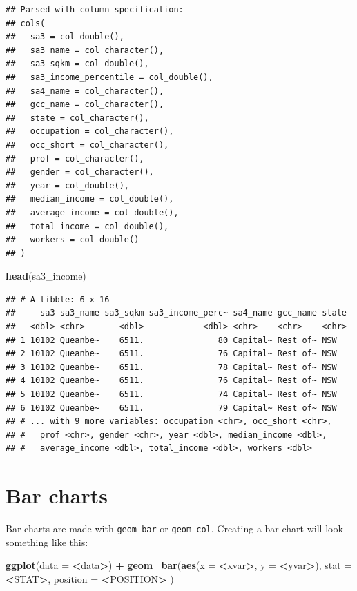 \documentclass[]{book}
\newenvironment{Shaded}{\begin{snugshade}}{\end{snugshade}}
\newcommand{\DataTypeTok}[1]{\textcolor[rgb]{0.13,0.29,0.53}{#1}}
\newcommand{\KeywordTok}[1]{\textcolor[rgb]{0.13,0.29,0.53}{\textbf{#1}}}
\newcommand{\NormalTok}[1]{#1}
\newcommand{\OperatorTok}[1]{\textcolor[rgb]{0.81,0.36,0.00}{\textbf{#1}}}
\newcommand{\StringTok}[1]{\textcolor[rgb]{0.31,0.60,0.02}{#1}}
\begin{document}
\begin{verbatim}
## Parsed with column specification:
## cols(
##   sa3 = col_double(),
##   sa3_name = col_character(),
##   sa3_sqkm = col_double(),
##   sa3_income_percentile = col_double(),
##   sa4_name = col_character(),
##   gcc_name = col_character(),
##   state = col_character(),
##   occupation = col_character(),
##   occ_short = col_character(),
##   prof = col_character(),
##   gender = col_character(),
##   year = col_double(),
##   median_income = col_double(),
##   average_income = col_double(),
##   total_income = col_double(),
##   workers = col_double()
## )
\end{verbatim}

\begin{Shaded}
\begin{Highlighting}[]
\KeywordTok{head}\NormalTok{(sa3_income)}
\end{Highlighting}
\end{Shaded}

\begin{verbatim}
## # A tibble: 6 x 16
##     sa3 sa3_name sa3_sqkm sa3_income_perc~ sa4_name gcc_name state
##   <dbl> <chr>       <dbl>            <dbl> <chr>    <chr>    <chr>
## 1 10102 Queanbe~    6511.               80 Capital~ Rest of~ NSW  
## 2 10102 Queanbe~    6511.               76 Capital~ Rest of~ NSW  
## 3 10102 Queanbe~    6511.               78 Capital~ Rest of~ NSW  
## 4 10102 Queanbe~    6511.               76 Capital~ Rest of~ NSW  
## 5 10102 Queanbe~    6511.               74 Capital~ Rest of~ NSW  
## 6 10102 Queanbe~    6511.               79 Capital~ Rest of~ NSW  
## # ... with 9 more variables: occupation <chr>, occ_short <chr>,
## #   prof <chr>, gender <chr>, year <dbl>, median_income <dbl>,
## #   average_income <dbl>, total_income <dbl>, workers <dbl>
\end{verbatim}

\hypertarget{bar-charts}{%
\section{Bar charts}\label{bar-charts}}

Bar charts are made with \texttt{geom\_bar} or \texttt{geom\_col}. Creating a bar chart will look something like this:

\begin{Shaded}
\begin{Highlighting}[]
\KeywordTok{ggplot}\NormalTok{(}\DataTypeTok{data =} \OperatorTok{<}\NormalTok{data}\OperatorTok{>}\NormalTok{) }\OperatorTok{+}\StringTok{ }
\StringTok{  }\KeywordTok{geom_bar}\NormalTok{(}\KeywordTok{aes}\NormalTok{(}\DataTypeTok{x =} \OperatorTok{<}\NormalTok{xvar}\OperatorTok{>}\NormalTok{, }\DataTypeTok{y =} \OperatorTok{<}\NormalTok{yvar}\OperatorTok{>}\NormalTok{),}
     \DataTypeTok{stat =} \OperatorTok{<}\NormalTok{STAT}\OperatorTok{>}\NormalTok{, }
     \DataTypeTok{position =} \OperatorTok{<}\NormalTok{POSITION}\OperatorTok{>}
\StringTok{  }\NormalTok{)}
\end{Highlighting}
\end{Shaded}
\end{document}
